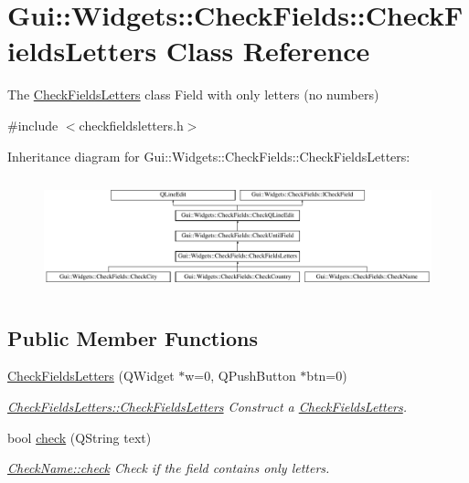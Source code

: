 \hypertarget{classGui_1_1Widgets_1_1CheckFields_1_1CheckFieldsLetters}{\section{Gui\-:\-:Widgets\-:\-:Check\-Fields\-:\-:Check\-Fields\-Letters Class Reference}
\label{classGui_1_1Widgets_1_1CheckFields_1_1CheckFieldsLetters}
}


The \hyperlink{classGui_1_1Widgets_1_1CheckFields_1_1CheckFieldsLetters}{Check\-Fields\-Letters} class Field with only letters (no numbers)  




{\ttfamily \#include $<$checkfieldsletters.\-h$>$}

Inheritance diagram for Gui\-:\-:Widgets\-:\-:Check\-Fields\-:\-:Check\-Fields\-Letters\-:\begin{figure}[H]
\begin{center}
\leavevmode
\includegraphics[height=3.345281cm]{df/dba/classGui_1_1Widgets_1_1CheckFields_1_1CheckFieldsLetters}
\end{center}
\end{figure}
\subsection*{Public Member Functions}
\begin{DoxyCompactItemize}
\item 
\hyperlink{classGui_1_1Widgets_1_1CheckFields_1_1CheckFieldsLetters_a2026c54051fdadca10860d0eaaa4b243}{Check\-Fields\-Letters} (Q\-Widget $\ast$w=0, Q\-Push\-Button $\ast$btn=0)
\begin{DoxyCompactList}\small\item\em \hyperlink{classGui_1_1Widgets_1_1CheckFields_1_1CheckFieldsLetters_a2026c54051fdadca10860d0eaaa4b243}{Check\-Fields\-Letters\-::\-Check\-Fields\-Letters} Construct a \hyperlink{classGui_1_1Widgets_1_1CheckFields_1_1CheckFieldsLetters}{Check\-Fields\-Letters}. \end{DoxyCompactList}\item 
bool \hyperlink{classGui_1_1Widgets_1_1CheckFields_1_1CheckFieldsLetters_a95f6808ecc2cedf22407fc1791827851}{check} (Q\-String text)
\begin{DoxyCompactList}\small\item\em \hyperlink{classGui_1_1Widgets_1_1CheckFields_1_1CheckFieldsLetters_a95f6808ecc2cedf22407fc1791827851}{Check\-Name\-::check} Check if the field contains only letters. \end{DoxyCompactList}\end{DoxyCompactItemize}
